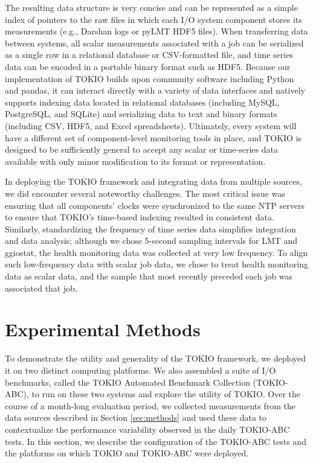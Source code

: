 The resulting data structure is very concise and can be represented as a simple index of pointers to the raw files in which each I/O system component stores its measurements (e.g., Darshan logs or pyLMT HDF5 files).
When transferring data between systems, all scalar measurements associated with a job can be serialized as a single row in a relational database or CSV-formatted file, and time series data can be encoded in a portable binary format such as HDF5.
Because our implementation of TOKIO builds upon community software including Python and pandas, it can interact directly with a variety of data interfaces and
natively supports indexing data located in relational databases (including MySQL, PostgreSQL, and SQLite) and serializing data to text and binary formats (including CSV, HDF5, and Excel spreadsheets).  Ultimately, every system will have a different set of component-level monitoring tools in place, and TOKIO is designed to be sufficiently general to accept any scalar or time-series data available with only minor modification to its format or representation.

In deploying the TOKIO framework and integrating data from multiple sources, we did encounter several noteworthy challenges.
The most critical issue was ensuring that all components' clocks were synchronized to the same NTP servers to ensure that TOKIO's time-based indexing resulted in consistent data.
Similarly, standardizing the frequency of time series data simplifies integration and data analysis; although we chose 5-second sampling intervals for LMT and ggiostat, the health monitoring data was collected at very low frequency.
To align such low-frequency data with scalar job data, we chose to treat health monitoring data as scalar data, and the sample that most recently preceded each job was associated that job.

\section{Experimental Methods} \label{sec:platforms}

To demonstrate the utility and generality of the TOKIO framework, we deployed it on two distinct computing platforms.
We also assembled a suite of I/O benchmarks, called the TOKIO Automated Benchmark Collection (TOKIO-ABC), to run on these two systems and explore the utility of TOKIO.  
Over the course of a month-long evaluation period, we collected measurements from the data sources described in Section \ref{sec:methods} and used these data to contextualize the performance variability observed in the daily TOKIO-ABC tests.
In this section, we describe the configuration of the TOKIO-ABC tests and the platforms on which TOKIO and TOKIO-ABC were deployed.

